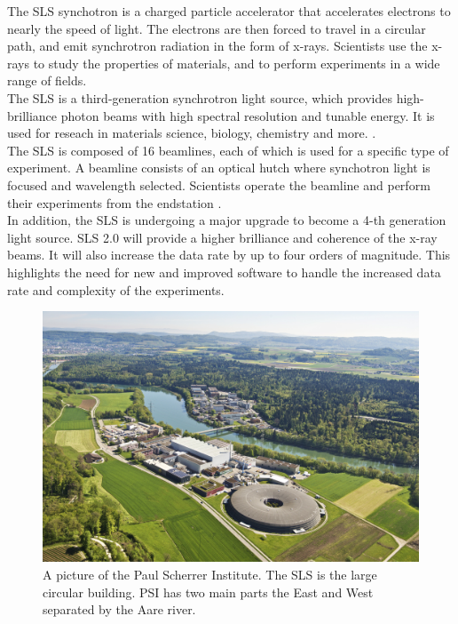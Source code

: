 \begin{spacing}{1.2}
    The SLS synchotron is a charged particle accelerator that accelerates electrons
    to nearly the speed of light. The electrons are then
    forced to travel in a circular path, and emit synchrotron radiation in the form of x-rays.
    Scientists use the x-rays to study the properties of materials, and to perform experiments in a wide range of fields.\\

    The SLS is a third-generation synchrotron light source, which provides high-brilliance photon beams
    with high spectral resolution and tunable energy. It is used for reseach in materials science,
    biology, chemistry and more. \cite{boge2002first, aboutSLS, PhysRevLett.128.024801}.\\

    The SLS is composed of 16 beamlines, each of which is used for a specific type of experiment.
    A beamline consists of an optical hutch where synchotron light is focused and
    wavelength selected. Scientists operate the beamline and perform their experiments
    from the endstation \cite{lightsource}.\\

    In addition, the SLS is undergoing a major upgrade to become a 4-th generation light source.
    SLS 2.0 will provide a higher brilliance    and coherence of the x-ray beams. It will also
    increase the data rate by up to four orders of magnitude. This highlights the need for
    new and improved software to handle the increased data rate and complexity of the experiments.\\







    \begin{figure}
        \centering
        \includegraphics[width=\textwidth]{Chapitre1/figures/psi.jpg}
        \caption{A picture of the Paul Scherrer Institute. The SLS is the large circular building.
            PSI has two main parts the East and West separated by the Aare river.}
        \label{fig:sls}
    \end{figure}


\end{spacing}
